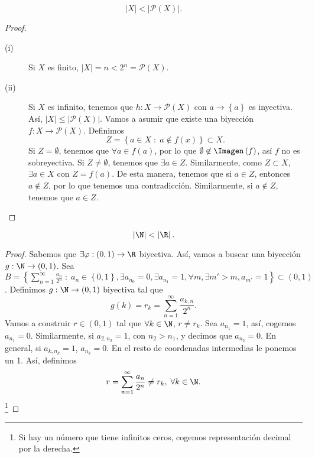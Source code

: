 \begin{fprop}[]
\normalfont 
\[ \left|X\right| < \left|\mathcal{P}\left(X\right)\right| .\]
\end{fprop}
\begin{proof}
\begin{description}
	\item[(i)] Si $\displaystyle X  $ es finito, $\displaystyle \left|X\right| = n < 2^{n} = \mathcal{P}\left(X\right) $.
	\item[(ii)] Si $\displaystyle X $ es infinito, tenemos que $\displaystyle h : X \to \mathcal{P}\left(X\right) $ con $\displaystyle a \to \left\{ a\right\}  $ es inyectiva. Así, $\displaystyle \left|X\right| \leq \left|\mathcal{P}\left(X\right)\right| $. Vamos a asumir que existe una biyección $\displaystyle f : X \to \mathcal{P}\left(X\right) $. Definimos
		\[Z = \left\{ a \in X \; : \; a \not\in f\left(x\right)\right\} \subset X .\]
Si $\displaystyle Z = \emptyset $, tenemos que $\displaystyle \forall a \in f\left(a\right) $, por lo que $\displaystyle \emptyset \not\in \Imagen\left(f\right) $, así $\displaystyle f $ no es sobreyectiva. Si $\displaystyle Z \neq \emptyset $, tenemos que $\displaystyle \exists a \in Z $. Similarmente, como $\displaystyle Z \subset X $, $\displaystyle \exists a \in X $ con $\displaystyle Z = f\left(a\right) $. De esta manera, tenemos que si $\displaystyle a \in Z $, entonces $\displaystyle a \not\in Z $, por lo que tenemos una contradicción. Similarmente, si $\displaystyle a \not\in Z $, tenemos que $\displaystyle a \in Z $.
\end{description}
\end{proof}
\begin{fprop}[]
\normalfont 
\[ \left|\N\right| < \left|\R\right| .\]
\end{fprop}
\begin{proof}
	Sabemos que $\displaystyle \exists\varphi : \left(0,1\right) \to \R $ biyectiva. Así, vamos a buscar una biyección $\displaystyle g : \N \to \left(0,1\right) $. Sea $\displaystyle B = \left\{ \sum^{\infty}_{n = 1}\frac{a_{n}}{2^{n}} \; : \; a_{n} \in \left\{ 0,1\right\} , \exists a_{n_{0}} = 0, \exists a_{n_{1}} = 1, \forall m, \exists m' > m, a_{m'} = 1\right\} \subset \left(0,1\right) $.
Definimos $\displaystyle g : \N \to \left(0,1\right) $ biyectiva tal que 
\[g\left(k\right) = r_{k} = \sum^{\infty}_{n = 1}\frac{a_{k,n}}{2^{n}} .\]
Vamos a construir $\displaystyle r \in \left(0,1\right) $ tal que $\displaystyle \forall k \in \N $, $\displaystyle r \neq r_{k} $. Sea $\displaystyle a_{n_{1}} = 1 $, así, cogemos $\displaystyle a_{n_{1}} = 0 $. Similarmente, si $\displaystyle a_{2,n_{2}}=1 $, con $\displaystyle n_{2} > n_{1} $, y decimos que $\displaystyle a_{n_{2}} = 0 $. En general, si $\displaystyle a_{k,n_{k}} = 1 $, $\displaystyle a_{n_{k}} = 0 $. En el resto de coordenadas intermedias le ponemos un 1. Así, definimos
\[r = \sum^{\infty}_{n=1}\frac{a_{n}}{2^{n}} \neq r_{k}, \; \forall k \in \N .\]
\footnote{Si hay un número que tiene infinitos ceros, cogemos representación decimal por la derecha.} 
\end{proof}
